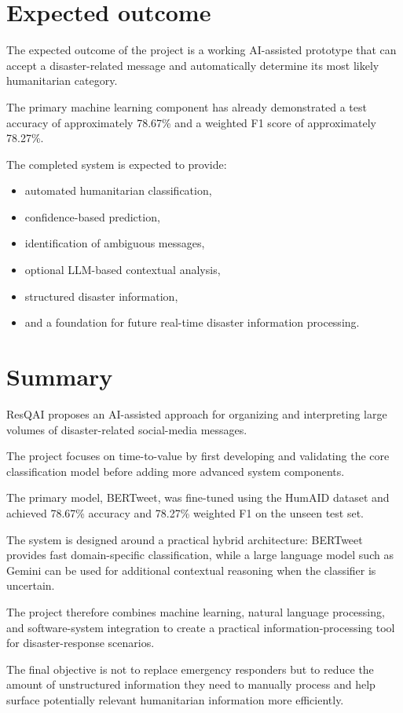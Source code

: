 \documentclass[11pt,a4paper]{article}
\begin{document}

\section{Expected outcome}

The expected outcome of the project is a working AI-assisted prototype that
can accept a disaster-related message and automatically determine its most
likely humanitarian category.

The primary machine learning component has already demonstrated a test
accuracy of approximately 78.67\% and a weighted F1 score of approximately
78.27\%.

The completed system is expected to provide:

\begin{itemize}[leftmargin=0.7cm]

    \item automated humanitarian classification,
    \item confidence-based prediction,
    \item identification of ambiguous messages,
    \item optional LLM-based contextual analysis,
    \item structured disaster information,
    \item and a foundation for future real-time disaster information
    processing.

\end{itemize}


\section{Summary}

ResQAI proposes an AI-assisted approach for organizing and interpreting
large volumes of disaster-related social-media messages.

The project focuses on time-to-value by first developing and validating the
core classification model before adding more advanced system components.

The primary model, BERTweet, was fine-tuned using the HumAID dataset and
achieved 78.67\% accuracy and 78.27\% weighted F1 on the unseen test set.

The system is designed around a practical hybrid architecture: BERTweet
provides fast domain-specific classification, while a large language model
such as Gemini can be used for additional contextual reasoning when the
classifier is uncertain.

The project therefore combines machine learning, natural language processing,
and software-system integration to create a practical information-processing
tool for disaster-response scenarios.

The final objective is not to replace emergency responders but to reduce the
amount of unstructured information they need to manually process and help
surface potentially relevant humanitarian information more efficiently.
\end{document}
